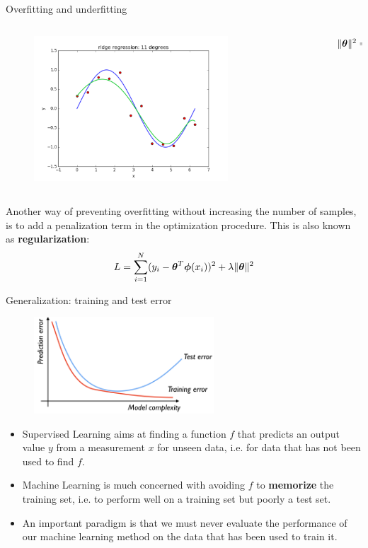 \documentclass[xcolor=pdftex,dvipsnames,table]{beamer}
\begin{document}
\begin{frame}{Overfitting and underfitting}
\begin{columns}
\begin{column}{.8\textwidth}
\begin{figure}[htb]
	\includegraphics[width=0.75\textwidth]{../graphics/ridge_regression_11_10.png}
\end{figure}
\end{column}
\begin{column}{.2\textwidth}
$\| \boldsymbol{\theta} \|^2 = 0.41$
\end{column}
\end{columns}
Another way of preventing overfitting without increasing the number of samples, is to add a penalization term in the optimization procedure. This is also known as \textbf{regularization}:
\begin{equation}
	L = \sum_{i=1}^N (y_i - \boldsymbol{\theta}^T \boldsymbol{\phi} (x_i))^2 + \lambda \| \boldsymbol{\theta} \|^2
\end{equation}
\end{frame}

\begin{frame}{Generalization: training and test error}
\begin{figure}[htb]
\includegraphics[width=0.6\textwidth]{../graphics/Training_and_test_error.png}
\end{figure}
\begin{itemize}
\item Supervised Learning aims at finding a function $f$ that predicts an output value $y$ from a measurement $x$ for unseen data, i.e. for data that has not been used to find $f$.
\item Machine Learning is much concerned with avoiding $f$ to \textbf{memorize} the training set, i.e. to perform well on a training set but poorly a test set.
\item An important paradigm is that we must never evaluate the performance of our machine learning method on the data that has been used to train it.
\end{itemize}
\end{frame}
\end{document}
